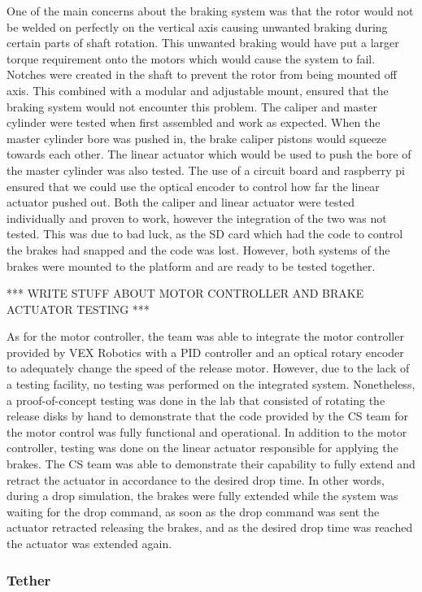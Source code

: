 One of the main concerns about the braking system was that the rotor would not be welded on perfectly on the vertical axis causing unwanted braking during certain parts of shaft rotation. This unwanted braking would have put a larger torque requirement onto the motors which would cause the system to fail. Notches were created in the shaft to prevent the rotor from being mounted off axis. This combined with a modular and adjustable mount, ensured that the braking system would not encounter this problem. The caliper and master cylinder were tested when first assembled and work as expected. When the master cylinder bore was pushed in, the brake caliper pistons would squeeze towards each other. The linear actuator which would be used to push the bore of the master cylinder was also tested. The use of a circuit board and raspberry pi ensured that we could use the optical encoder to control how far the linear actuator pushed out. Both the caliper and linear actuator were tested individually and proven to work, however the integration of the two was not tested. This was due to bad luck, as the SD card which had the code to control the brakes had snapped and the code was lost. However, both systems of the brakes were mounted to the platform and are ready to be tested together. 

*** WRITE STUFF ABOUT MOTOR CONTROLLER AND BRAKE ACTUATOR TESTING ***

As for the motor controller, the team was able to integrate the motor controller provided by VEX Robotics with a PID controller and an optical rotary encoder to adequately change the speed of the release motor. However, due to the lack of a testing facility, no testing was performed on the integrated system. Nonetheless, a proof-of-concept testing was done in the lab that consisted of rotating the release disks by hand to demonstrate that the code provided by the CS team for the motor control was fully functional and operational. In addition to the motor controller, testing was done on the linear actuator responsible for applying the brakes. The CS team was able to demonstrate their capability to fully extend and retract the actuator in accordance to the desired drop time. In other words, during a drop simulation, the brakes were fully extended while the system was waiting for the drop command, as soon as the drop command was sent the actuator retracted releasing the brakes, and as the desired drop time was reached the actuator was extended again.

\subsubsection{Tether}


